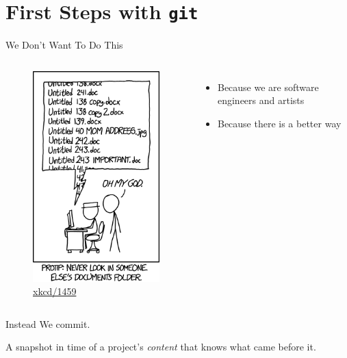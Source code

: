 \documentclass{beamer}
\theoremstyle{example}
\newcommand{\xkcd}[1]{\href{https://xkcd.com/#1}{xkcd/#1}}
\begin{document}
\section{First Steps with \texttt{git}}
\begin{frame}{We Don't Want To Do This}
    \begin{columns}
        \begin{figure}
            \includegraphics[scale=0.4]{img/documents}
            \caption{\xkcd{1459}}
        \end{figure}

        \begin{itemize}
            \item Because we are software engineers and artists
            \item Because there is a better way
        \end{itemize}
    \end{columns}
\end{frame}

\begin{frame}{Instead}
    We commit.

    \begin{definition}[Commit]
        A snapshot in time of a project's \emph{content} that knows what came
        before it.
    \end{definition}
\end{frame}
\end{document}
